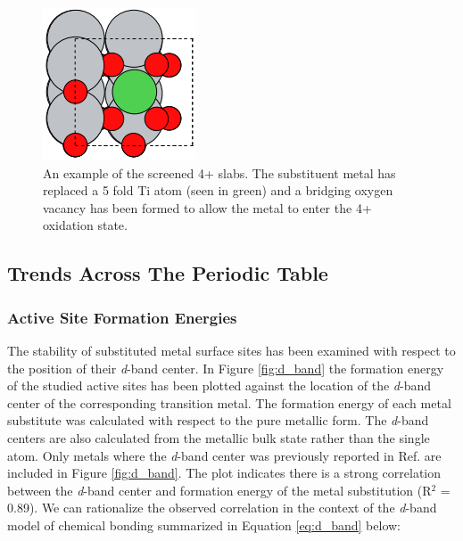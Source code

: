 \begin{figure}
    \centering
    \includegraphics[width=0.5\linewidth]{Images/ex_4+_slab.png}
    \caption{An example of the screened 4+ slabs. The substituent metal has replaced a 5 fold Ti atom (seen in green) and a bridging oxygen vacancy has been formed to allow the metal to enter the 4+ oxidation state.}
    \label{fig:2+ex_slab}
\end{figure}

\subsection{Trends Across The Periodic Table}


\subsubsection{Active Site Formation Energies}

The stability of substituted metal surface sites has been examined with respect to the position of their \textit{d}-band center. In Figure \ref{fig:d_band} the formation energy of the studied active sites has been plotted against the location of the \textit{d}-band center of the corresponding transition metal. The formation energy of each metal substitute was calculated with respect to the pure metallic form. The \textit{d}-band centers are also calculated from the metallic bulk state rather than the single atom. Only metals where the \textit{d}-band center was previously reported in Ref.  are included in Figure \ref{fig:d_band}. The plot indicates there is a strong correlation between the \textit{d}-band center and formation energy of the metal substitution (R$^2$ = 0.89). We can rationalize the observed correlation in the context of the \textit{d}-band model of chemical bonding \cite{Nilsson_2008} summarized in Equation \ref{eq:d_band} below:

